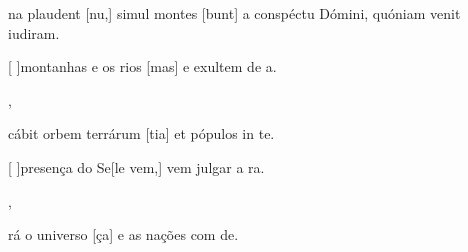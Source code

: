 {  {\item {}na plaudent [nu,] simul montes [\-bunt] a conspéctu Dómini, quóniam venit iudi\-ram.~\Antiphona}%
    {\item {}[ ]{mon}tanhas e os rios [mas] e exultem de a.~\Antiphona},
  {\item {}cábit orbem terrárum [tia] et pópulos in te.~\Antiphona}%
    {\item {}[ ]{pre}sença do Se[le vem,] vem julgar a ra.~\Antiphona},
  {~\Antiphona}%
    {\item {}rá o universo [ça] e as nações com de.~\Antiphona}
}